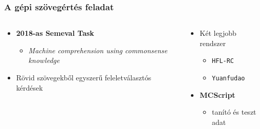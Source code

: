 \documentclass[bigger]{beamer}
\begin{document}
\begin{frame}
	\frametitle{A gépi szövegértés feladat \citep{Chen:2018, Wang:2018}}
	\begin{columns}
		\begin{column}{0.6\textwidth}
			\begin{itemize}
				\pause \item \textbf{2018-as Semeval Task}
				\begin{itemize}
					\item \textit{Machine comprehension using commonsense knowledge}
				\end{itemize}
				\pause \item Rövid szövegekből egyszerű feleletválasztós kérdések
			\end{itemize}
		\end{column}
		\begin{column}{0.5\textwidth}
			\begin{itemize}
			\pause \item Két legjobb rendszer
			\begin{itemize}
				\item \texttt{HFL-RC}
				\item \texttt{Yuanfudao}
			\end{itemize}
			\pause \item \textbf{MCScript}
			\begin{itemize}
				\item tanító és teszt adat
			\end{itemize}
		\end{itemize}
		\end{column}
	\end{columns}
	
	\end{frame}
\end{document}
